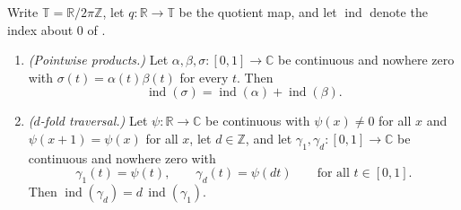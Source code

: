 \begin{lemma}
Write $\mathbb{T}=\mathbb{R}/2\pi\mathbb{Z}$, let $q\colon\mathbb{R}\to\mathbb{T}$
be the quotient map, and let $\operatorname{ind}$ denote the index about $0$ of
.
\begin{enumerate}
\item[(a)] \emph{(Pointwise products.)}  Let
$\alpha,\beta,\sigma\colon[0,1]\to\mathbb{C}$ be continuous and nowhere zero
with $\sigma(t)=\alpha(t)\beta(t)$ for every $t$.  Then
\[
  \operatorname{ind}(\sigma)=\operatorname{ind}(\alpha)+\operatorname{ind}(\beta).
\]
\item[(b)] \emph{($d$-fold traversal.)}  Let $\psi\colon\mathbb{R}\to\mathbb{C}$
be continuous with $\psi(x)\neq0$ for all $x$ and $\psi(x+1)=\psi(x)$ for all
$x$, let $d\in\mathbb{Z}$, and let
$\gamma_1,\gamma_d\colon[0,1]\to\mathbb{C}$ be continuous and nowhere zero with
\[
  \gamma_1(t)=\psi(t),\qquad \gamma_d(t)=\psi(dt)\qquad\text{for all }t\in[0,1].
\]
Then $\operatorname{ind}(\gamma_d)=d\,\operatorname{ind}(\gamma_1)$.
\end{enumerate}
\end{lemma}
